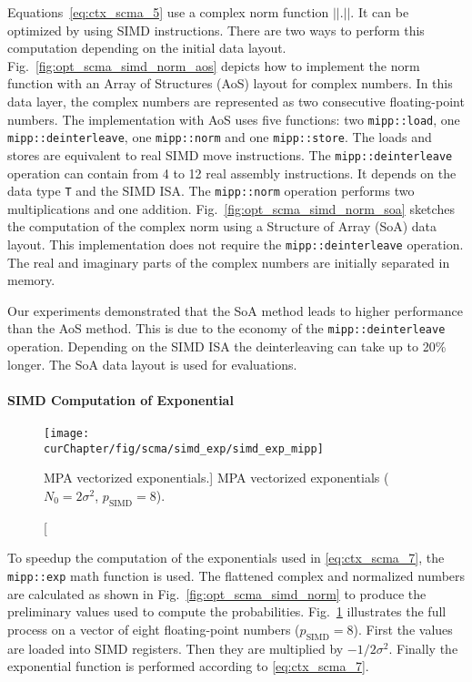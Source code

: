Equations~\eqref{eq:ctx_scma_5} use a complex norm function $||.||$. It can be
optimized by using SIMD instructions. There are two ways to perform this
computation depending on the initial data layout.
Fig.~\ref{fig:opt_scma_simd_norm_aos} depicts how to implement the norm function
with an Array of Structures (AoS) layout for complex numbers. In this data
layer, the complex numbers are represented as two consecutive floating-point
numbers. The implementation with AoS uses five \MIPP functions: two
\verb|mipp::load|, one \verb|mipp::deinterleave|, one \verb|mipp::norm| and one
\verb|mipp::store|. The \MIPP loads and stores are equivalent to real SIMD
move instructions. The \verb|mipp::deinterleave| operation can contain from 4 to
12 real assembly instructions. It depends on the data type \verb|T| and the SIMD
ISA. The \verb|mipp::norm| operation performs two multiplications and one
addition. Fig.~\ref{fig:opt_scma_simd_norm_soa} sketches the computation of the
complex norm using a Structure of Array (SoA) data layout. This implementation
does not require the \MIPP \verb|mipp::deinterleave| operation. The real
and imaginary parts of the complex numbers are initially separated in memory.

Our experiments demonstrated that the SoA method leads to higher performance
than the AoS method. This is due to the economy of the \verb|mipp::deinterleave|
operation. Depending on the SIMD ISA the deinterleaving can take up to 20\%
longer. The SoA data layout is used for evaluations.

\paragraph{SIMD Computation of Exponential}

\begin{figure}[htp]
  \centering
  \texttt{[image: \\curChapter/fig/scma/simd\_exp/simd\_exp\_mipp]}
  \caption
    [MPA vectorized exponentials.]
    {MPA vectorized exponentials ($N_0 = 2\sigma^2$, $p_\text{SIMD} = 8$).}
  \label{fig:opt_scma_simd_exp}
\end{figure}

To speedup the computation of the exponentials used in \eqref{eq:ctx_scma_7},
the \verb|mipp::exp| math function is used. The flattened complex and normalized
numbers are calculated as shown in Fig.~\ref{fig:opt_scma_simd_norm} to produce
the preliminary values used to compute the probabilities.
Fig.~\ref{fig:opt_scma_simd_exp} illustrates the full process on a vector of
eight floating-point numbers ($p_\text{SIMD} = 8$). First the values are loaded
into SIMD registers. Then they are multiplied by $-1/2\sigma^2$. Finally the
exponential function is performed according to \eqref{eq:ctx_scma_7}.

